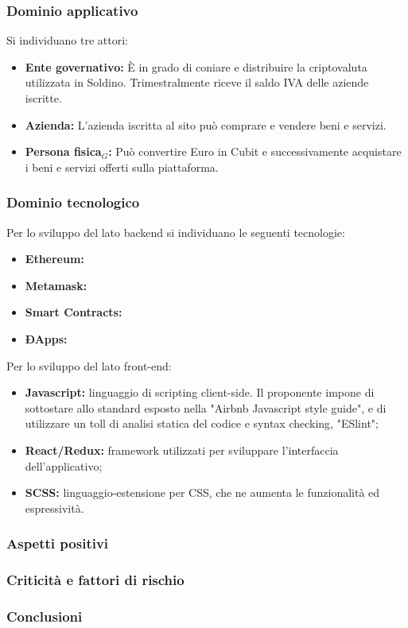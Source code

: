 \subsubsection{Dominio applicativo}
Si individuano tre attori:
\begin{itemize}	
	\item \textbf{Ente governativo: }\`E in grado di coniare e distribuire la 
	criptovaluta utilizzata in Soldino. Trimestralmente riceve il saldo IVA 
	delle aziende iscritte.
	\item \textbf{Azienda: } L'azienda iscritta al sito può comprare e vendere 
	beni e servizi. %
	\item \textbf{Persona fisica$_{G}$: }Può convertire Euro in Cubit e successivamente acquistare
	i beni e servizi offerti sulla piattaforma.
\end{itemize}
\subsubsection{Dominio tecnologico}
Per lo sviluppo del lato backend si individuano le seguenti tecnologie:
\begin{itemize}
	\item \textbf{Ethereum:}
	\item \textbf{Metamask:}
	\item \textbf{Smart Contracts:}
	\item \textbf{ÐApps:}
\end{itemize}
Per lo sviluppo del lato front-end:
\begin{itemize}
	\item \textbf{Javascript:} linguaggio di scripting client-side. Il proponente impone di sottostare allo standard esposto nella "Airbnb Javascript style guide", e di utilizzare un toll di analisi statica del codice e syntax checking, "ESlint";
	\item \textbf{React/Redux:} framework utilizzati per sviluppare l'interfaccia dell'applicativo;
	\item \textbf{SCSS:} linguaggio-estensione per CSS, che ne aumenta le funzionalità ed espressività.
\end{itemize}


\subsubsection{Aspetti positivi}

\subsubsection{Criticità e fattori di rischio}

\subsubsection{Conclusioni}
